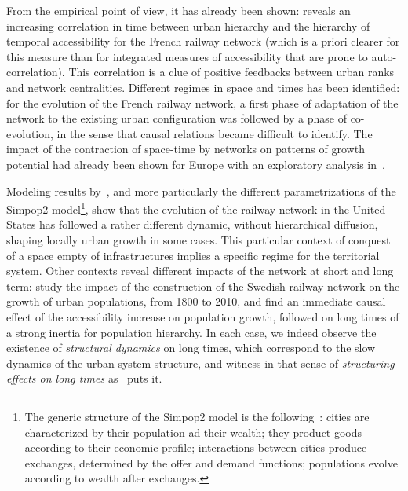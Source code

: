 From the empirical point of view, it has already been shown: \cite{bretagnolle:tel-00459720} reveals an increasing correlation in time between urban hierarchy and the hierarchy of temporal accessibility for the French railway network (which is a priori clearer for this measure than for integrated measures of accessibility that are prone to auto-correlation). This correlation is a clue of positive feedbacks between urban ranks and network centralities. Different regimes in space and times has been identified: for the evolution of the French railway network, a first phase of adaptation of the network to the existing urban configuration was followed by a phase of co-evolution, in the sense that causal relations became difficult to identify. The impact of the contraction of space-time by networks on patterns of growth potential had already been shown for Europe with an exploratory analysis in~\citep{bretagnolle1998space}.

Modeling results by~\cite{bretagnolle2010comparer}, and more particularly the different parametrizations of the Simpop2 model\footnote{The generic structure of the Simpop2 model is the following~\citep{pumain2008socio}: cities are characterized by their population ad their wealth; they product goods according to their economic profile; interactions between cities produce exchanges, determined by the offer and demand functions; populations evolve according to wealth after exchanges.}, show that the evolution of the railway network in the United States has followed a rather different dynamic, without hierarchical diffusion, shaping locally urban growth in some cases. This particular context of conquest of a space empty of infrastructures implies a specific regime for the territorial system. Other contexts reveal different impacts of the network at short and long term: \cite{berger2017locomotives} study the impact of the construction of the Swedish railway network on the growth of urban populations, from 1800 to 2010, and find an immediate causal effect of the accessibility increase on population growth, followed on long times of a strong inertia for population hierarchy. In each case, we indeed observe the existence of \emph{structural dynamics} on long times, which correspond to the slow dynamics of the urban system structure, and witness in that sense of \emph{structuring effects on long times} as~\cite{pumain2014effets} puts it.

